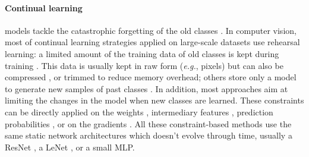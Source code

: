 \paragraph{Continual learning} models tackle the catastrophic forgetting of the old classes
\citep{thrun1998lifelonglearning,french1999catastrophicforgetting}. In computer vision, most of
continual learning strategies applied on large-scale datasets use rehearsal learning: a limited
amount of the training data of old classes is kept during training
\citep{robins1995catastrophicforgetting}. This data is usually kept in raw form (\textit{e.g.},
pixels) \citep{rebuffi2017icarl,castro2018end_to_end_inc_learn,chaudhry2019tinyepisodicmemories} but
can also be compressed \citep{hayes2020remind,iscen2020incrementalfeatureadaptation}, or trimmed
\citep{douillard2021objectrehearsal} to reduce memory overhead; others store only a model to generate
new samples of past classes
\citep{kemker2018fearnet,shin2017deep_generative_replay,lesort2019generative}. In addition, most
approaches aim at limiting the changes in the model when new classes are learned. These constraints
can be directly applied on the weights
\citep{kirkpatrick2017ewc,zenke2017synaptic_intelligence,aljundi2018MemoryAwareSynapses,chaudhry2018riemannien_walk},
intermediary features
\citep{hou2019ucir,dhar2019learning_without_memorizing_gradcam,peng2019m2kd,douillard2020podnet,douillard2020plop},
prediction probabilities
\citep{li2018lwf,rebuffi2017icarl,castro2018end_to_end_inc_learn,cermelli2020modelingthebackground},
or on the gradients \citep{lopezpaz2017gem,chaudhry2019AGEM,farajtabar2020ogd,saha2021gpm}. All these
constraint-based methods use the same static network architectures which doesn't evolve through
time, usually a ResNet \citep{he2016resnet}, a LeNet \citep{lecun1999lenet}, or a small MLP.


